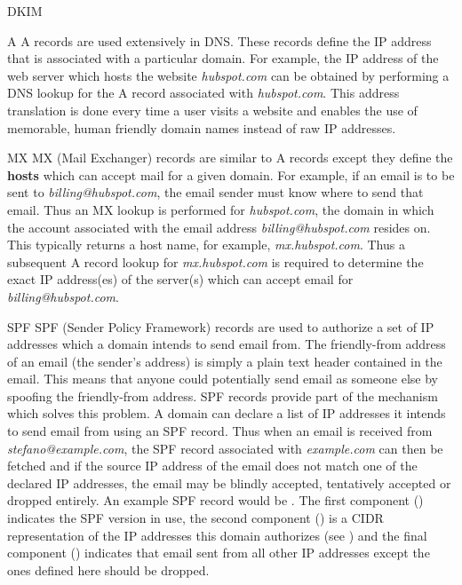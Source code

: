 \begin{labeling}{DKIM }
  \item[A] A records are used extensively in DNS. These records define the IP address that is associated with a particular domain. For example, the IP address of the web server which hosts the website \textit{hubspot.com} can be obtained by performing a DNS lookup for the A record associated with \textit{hubspot.com}. This address translation is done every time a user visits a website and enables the use of memorable, human friendly domain names instead of raw IP addresses.
  \item[MX] MX (Mail Exchanger) records are similar to A records except they define the \textbf{hosts} which can accept mail for a given domain. For example, if an email is to be sent to \textit{billing@hubspot.com}, the email sender must know where to send that email. Thus an MX lookup is performed for \textit{hubspot.com}, the domain in which the account associated with the email address \textit{billing@hubspot.com} resides on. This typically returns a host name, for example, \textit{mx.hubspot.com}. Thus a subsequent A record lookup for \textit{mx.hubspot.com} is required to determine the exact IP address(es) of the server(s) which can accept email for \textit{billing@hubspot.com}.
  \item[SPF] SPF (Sender Policy Framework) records are used to authorize a set of IP addresses which a domain intends to send email from. The friendly-from address of an email (the sender's address) is simply a plain text header contained in the email. This means that anyone could potentially send email as someone else by spoofing the friendly-from address. SPF records provide part of the mechanism which solves this problem. A domain can declare a list of IP addresses it intends to send email from using an SPF record. Thus when an email is received from \textit{stefano@example.com}, the SPF record associated with \textit{example.com} can then be fetched and if the source IP address of the email does not match one of the declared IP addresses, the email may be blindly accepted, tentatively accepted or dropped entirely. An example SPF record would be . The first component () indicates the SPF version in use, the second component () is a CIDR representation of the IP addresses this domain authorizes (see ) and the final component () indicates that email sent from all other IP addresses except the ones defined here should be dropped. 

\end{labeling}
